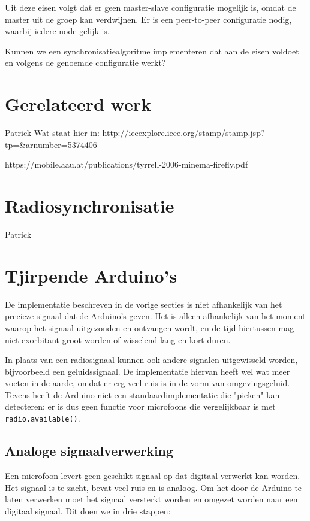 \documentclass[a4paper,10pt]{article}
\begin{document}
Uit deze eisen volgt dat er geen master-slave configuratie mogelijk is, omdat de master uit de groep kan verdwijnen. Er is een peer-to-peer configuratie nodig, waarbij iedere node gelijk is.

Kunnen we een synchronisatiealgoritme implementeren dat aan de eisen voldoet en volgens de genoemde configuratie werkt?

\section{Gerelateerd werk}
Patrick
\cite{tyrrell2010emergent}
Wat staat hier in: 
http://ieeexplore.ieee.org/stamp/stamp.jsp?tp=&arnumber=5374406

https://mobile.aau.at/publications/tyrrell-2006-minema-firefly.pdf


\section{Radiosynchronisatie}\label{sec:radiosync}
Patrick

\section{Tjirpende Arduino's}\label{sec:geluidssec}
De implementatie beschreven in de vorige secties is niet afhankelijk van het precieze signaal dat de Arduino's geven. Het is alleen afhankelijk van het moment waarop het signaal uitgezonden en ontvangen wordt, en de tijd hiertussen mag niet exorbitant groot worden of wisselend lang en kort duren.

In plaats van een radiosignaal kunnen ook andere signalen uitgewisseld worden, bijvoorbeeld een geluidssignaal. De implementatie hiervan heeft wel wat meer voeten in de aarde, omdat er erg veel ruis is in de vorm van omgevingsgeluid. Tevens heeft de Arduino niet een standaardimplementatie die "pieken" kan detecteren; er is dus geen functie voor microfoons die vergelijkbaar is met \texttt{radio.available()}.

\subsection{Analoge signaalverwerking}
Een microfoon levert geen geschikt signaal op dat digitaal verwerkt kan worden. Het signaal is te zacht, bevat veel ruis en is analoog. Om het door de Arduino te laten verwerken moet het signaal versterkt worden en omgezet worden naar een digitaal signaal. Dit doen we in drie stappen:
\end{document}
